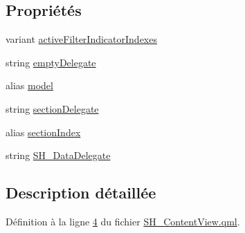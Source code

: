 \subsection*{Propriétés}
\begin{DoxyCompactItemize}
\item 
variant \hyperlink{classSH__ContentView_a7ea5cf24986d3fb77ebcdfc9c3a3822a}{active\-Filter\-Indicator\-Indexes}
\item 
string \hyperlink{classSH__ContentView_a243657fbb9155fd4af8e14c225795aa8}{empty\-Delegate}
\item 
alias \hyperlink{classSH__ContentView_ace8288902fb10eb93de67293bc8ac57c}{model}
\item 
string \hyperlink{classSH__ContentView_a5a5fa8f42e23b857494f2c88b39d1177}{section\-Delegate}
\item 
alias \hyperlink{classSH__ContentView_a554c2eaf9b48986c87fa8fb0178c0d1d}{section\-Index}
\item 
string \hyperlink{classSH__ContentView_a61539dec6a9f22a4bab8fad98231e549}{S\-H\-\_\-\-Data\-Delegate}
\end{DoxyCompactItemize}


\subsection{Description détaillée}


Définition à la ligne \hyperlink{SH__ContentView_8qml_source_l00004}{4} du fichier \hyperlink{SH__ContentView_8qml_source}{S\-H\-\_\-\-Content\-View.\-qml}.



